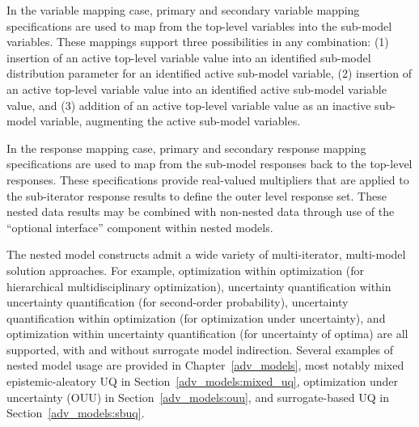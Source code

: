 In the variable mapping case, primary and secondary variable
mapping specifications are used to map from the top-level variables
into the sub-model variables.  These mappings support three
possibilities in any combination: (1) insertion of an active top-level
variable value into an identified sub-model distribution parameter for
an identified active sub-model variable, (2) insertion of an active
top-level variable value into an identified active sub-model variable
value, and (3) addition of an active top-level variable value as an
inactive sub-model variable, augmenting the active sub-model
variables.

In the response mapping case, primary and secondary response
mapping specifications are used to map from the sub-model responses
back to the top-level responses.  These specifications provide
real-valued multipliers that are applied to the sub-iterator response
results to define the outer level response set.  These nested data
results may be combined with non-nested data through use of the 
``optional interface'' component within nested models.

The nested model constructs admit a wide variety of multi-iterator,
multi-model solution approaches.  For example, optimization within
optimization (for hierarchical multidisciplinary optimization),
uncertainty quantification within uncertainty quantification (for
second-order probability), uncertainty quantification within
optimization (for optimization under uncertainty), and optimization
within uncertainty quantification (for uncertainty of optima) are all
supported, with and without surrogate model indirection.  Several
examples of nested model usage are provided in
Chapter~\ref{adv_models}, most notably mixed epistemic-aleatory UQ in
Section~\ref{adv_models:mixed_uq}, optimization under uncertainty
(OUU) in Section~\ref{adv_models:ouu}, and surrogate-based UQ in
Section~\ref{adv_models:sbuq}.
